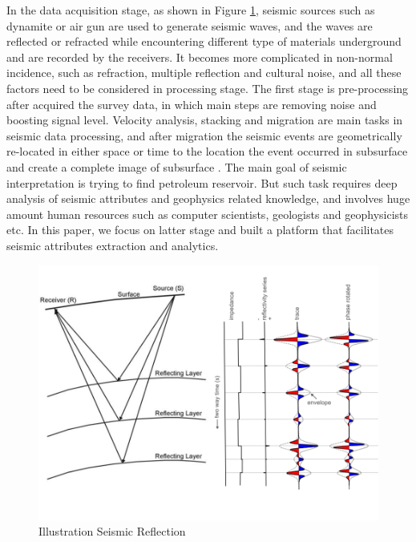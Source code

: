 In the data acquisition stage, as shown in Figure \ref{seismic_reflection}, seismic sources such as dynamite or air gun are used to generate seismic waves, and the waves are reflected or refracted while encountering different type of materials underground and are recorded by the receivers. It becomes more complicated in non-normal incidence, such as refraction, multiple reflection and cultural noise, and all these factors need to be considered in processing stage. The first stage is pre-processing after acquired the survey data, in which main steps are removing noise and boosting signal level. Velocity analysis, stacking and migration are main tasks in seismic data processing, and after migration the seismic events are geometrically re-located in either space or time to the location the event occurred in subsurface and create a complete image of subsurface \cite{seisreflectionwiki}. The main goal of seismic interpretation is trying to find petroleum reservoir. But such task requires deep analysis of seismic attributes and geophysics related knowledge, and involves huge amount human resources such as computer scientists, geologists and geophysicists etc. In this paper, we focus on latter stage and built a platform that facilitates seismic attributes extraction and analytics.   

\begin{figure}[h]
\centering
\includegraphics[scale=0.4]{figures/seismic_reflection_principal.png}
\caption{Illustration Seismic Reflection \cite{seisreflectionepa} \cite{seisreflectionagile}}
\label{seismic_reflection}
\end{figure}

